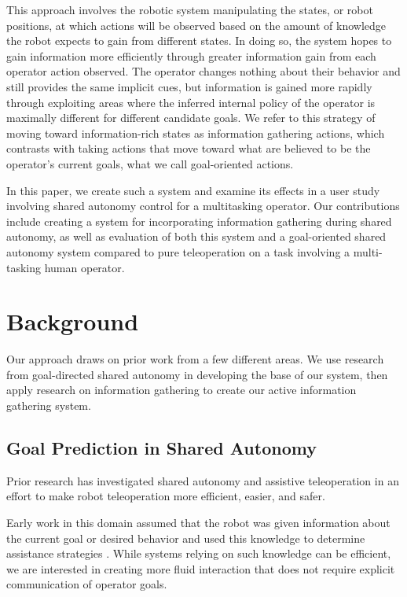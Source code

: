 \documentclass[conference]{IEEEtran}
\begin{document}
This approach involves the robotic system manipulating the states, or robot positions, at which actions will be observed based on the amount of knowledge the robot expects to gain from different states. In doing so, the system hopes to gain information more efficiently through greater information gain from each operator action observed. The operator changes nothing about their behavior and still provides the same implicit cues, but information is gained more rapidly through exploiting areas where the inferred internal policy of the operator is maximally different for different candidate goals. We refer to this strategy of moving toward information-rich states as information gathering actions, which contrasts with taking actions that move toward what are believed to be the operator's current goals, what we call goal-oriented actions. 

In this paper, we create such a system and examine its effects in a user study involving shared autonomy control for a multitasking operator. Our contributions include creating a system for incorporating information gathering during shared autonomy, as well as evaluation of both this system and a goal-oriented shared autonomy system compared to pure teleoperation on a task involving a multi-tasking human operator.

\section{Background}

Our approach draws on prior work from a few different areas. We use research from goal-directed shared autonomy in developing the base of our system, then apply research on information gathering to create our active information gathering system.

\subsection{Goal Prediction in Shared Autonomy}

Prior research has investigated shared autonomy and assistive teleoperation in an effort to make robot teleoperation more efficient, easier, and safer.

Early work in this domain assumed that the robot was given information about the current goal or desired behavior and used this knowledge to determine assistance strategies \cite{aigner1997human, debus2001cooperative, goodrich2001experiments}. While systems relying on such knowledge can be efficient, we are interested in creating more fluid interaction that does not require explicit communication of operator goals.
\end{document}
